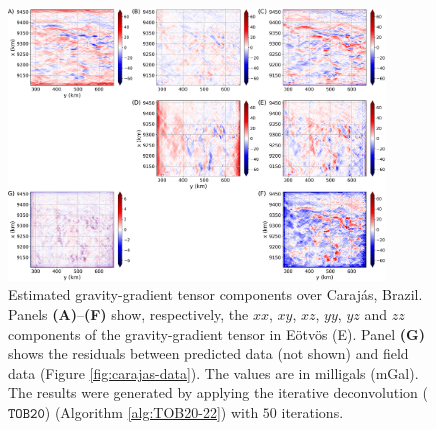 \begin{figure}[htbp]
	\begin{center}
		\includegraphics[width=10cm]{Fig/carajas_grav_gradient}
	\end{center}
	\caption{
		Estimated gravity-gradient tensor components over Caraj{\'a}s, Brazil.
		Panels \textbf{(A)}--\textbf{(F)} show, respectively, the $xx$, $xy$, $xz$, $yy$, $yz$ and
		$zz$ components of the gravity-gradient tensor in Eötvös (E).
		Panel \textbf{(G)} shows the residuals between predicted data (not shown) and field data 
		(Figure \ref{fig:carajas-data}). The values are in milligals (mGal).
		The results were generated by applying the iterative deconvolution ($\mathtt{TOB20}$)
		(Algorithm \ref{alg:TOB20-22})
		with $50$ iterations.
		}
	\label{fig:carajas-grav-gradient}
\end{figure}



%

%
